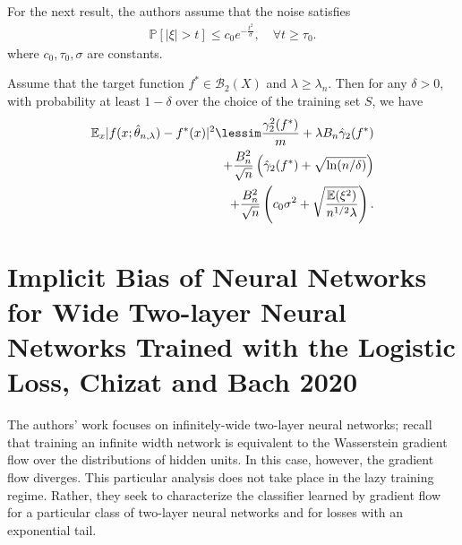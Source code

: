\documentclass{article}
\newenvironment{manualtheorem}[1]{%
  \renewcommand\themanualtheoreminner{#1}%
  \manualtheoreminner
}{\endmanualtheoreminner}
\begin{document}
For the next result, the authors assume that the noise satisfies 
\begin{align*}
    \mathbb{P}[|\xi| > t] \leq c_0 e^{-\frac{t^2}{\sigma}}, \quad \forall t \geq \tau_0.
\end{align*}
where $c_0, \tau_0, \sigma$ are constants.
\begin{manualtheorem}{4.2}
Assume that the target function $f^* \in \mathcal{B}_2(X)$ and $\lambda \geq \lambda_n$. Then for any $\delta > 0$, with probability at least $1- \delta$ over the choice of the training set $S$, we have
\begin{align*}
    \mathbb{E}_x|f(x; \hat{\theta}_{n, \lambda}) - f^*(x)|^2 \lessim \frac{\gamma_2^2(f^*)}{m} + \lambda B_n \hat{\gamma}_2(f^*)\\
    + \frac{B_n^2}{\sqrt{n}}\left( \hat{\gamma}_2(f^*) + \sqrt{\ln(n/\delta)} \right)\\
    + \frac{B_n^2}{\sqrt{n}}\left( c_0 \sigma^2 + \sqrt{\frac{\mathbb{E}(\xi^2)}{n^{1/2}\lambda}} \right).
\end{align*}
\end{manualtheorem}

\section{Implicit Bias of Neural Networks for Wide Two-layer Neural Networks Trained with the Logistic Loss, Chizat and Bach 2020}

The authors' work focuses on infinitely-wide two-layer neural networks; recall that training an infinite width network is equivalent to the Wasserstein gradient flow over the distributions of hidden units. In this case, however, the gradient flow diverges. This particular analysis does not take place in the lazy training regime. Rather, they seek to characterize the classifier learned by gradient flow for a particular class of two-layer neural networks and for losses with an exponential tail.
\end{document}
